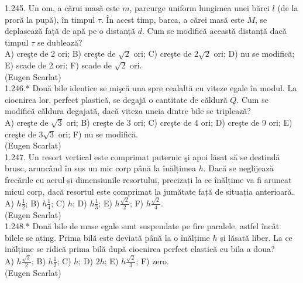 1.245. Un om, a cărui masă este $m$, parcurge uniform lungimea unei bărci $l$ (de la proră la pupă), în timpul $\tau$. În acest timp, barca, a cărei masă este $M$, se deplasează faṭă de apă pe o distanță $d$. Cum se modifică această distanță dacă timpul $\tau$ se dublează?\\ A) creşte de 2 ori; B) creşte de $\sqrt{2}$ ori; C) creşte de $2 \sqrt{2}$ ori; D) nu se modifică; E) scade de 2 ori; F) scade de $\sqrt{2}$ ori.\\ (Eugen Scarlat)\\

1.246.* Două bile identice se mişcă una spre cealaltă cu viteze egale în modul. La ciocnirea lor, perfect plastică, se degajă o cantitate de căldură $Q$. Cum se modifică căldura degajată, dacă viteza uneia dintre bile se triplează?\\ A) creşte de $\sqrt{3}$ ori; B) creşte de 3 ori; C) creşte de 4 ori; D) creşte de 9 ori; E) creşte de $3 \sqrt{3}$ ori; F) nu se modifică.\\ (Eugen Scarlat)\\

1.247. Un resort vertical este comprimat puternic şi apoi lăsat să se destindă brusc, aruncând în sus un mic corp până la înălțimea $h$. Dacă se neglijează frecările cu aerul și dimensiunile resortului, precizați la ce înălțime va fi aruncat micul corp, dacă resortul este comprimat la jumătate față de situația anterioară.\\ A) $h \frac{1}{2}$; B) $h \frac{1}{4}$; C) $h$; D) $h \frac{1}{3}$; E) $h \frac{\sqrt{2}}{2}$; F) $h \frac{\sqrt{2}}{4}$.\\ (Eugen Scarlat)\\

1.248.* Două bile de mase egale sunt suspendate pe fire paralele, astfel încât bilele se ating. Prima bilă este deviată până la o înălțime $h$ și lăsată liber. La ce inălțime se ridică prima bilă după ciocnirea perfect elastică cu bila a doua?\\ A) $h \frac{\sqrt{3}}{2}$; B) $h \frac{1}{2}$; C) $h$; D) $2 h$; E) $h \frac{\sqrt{2}}{3}$; F) zero.\\ (Eugen Scarlat)\\

